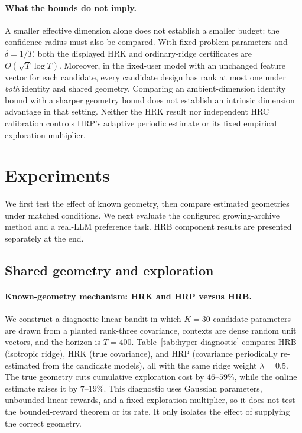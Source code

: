\documentclass{article} %
\begin{document}
\paragraph{What the bounds do not imply.}
A smaller effective dimension alone does not establish a smaller budget:
the confidence radius must also be compared. With fixed problem parameters
and $\delta=1/T$, both the displayed HRK and ordinary-ridge certificates
are $O(\sqrt T\log T)$. Moreover, in the fixed-user model with an unchanged
feature vector for each candidate, every candidate design has rank at most
one under \emph{both} identity and shared geometry. Comparing an
ambient-dimension identity bound with a sharper geometry bound does not
establish an intrinsic dimension advantage in that setting.
Neither the HRK result nor independent HRC calibration controls HRP's
adaptive periodic estimate or its fixed empirical exploration multiplier.

\section{Experiments}
\label{sec:experiments}

We first test the effect of known geometry, then compare estimated
geometries under matched conditions. We next evaluate the configured
growing-archive method and a real-LLM preference task. HRB component results
are presented separately at the end.

\subsection{Shared geometry and exploration}
\label{sec:exp-hyper-ridge-plan}

\paragraph{Known-geometry mechanism: HRK and HRP versus HRB.}
We construct a diagnostic linear bandit in which $K=30$ candidate parameters are drawn from a planted rank-three covariance, contexts are dense random unit vectors, and the horizon is $T=400$. Table~\ref{tab:hyper-diagnostic} compares HRB (isotropic ridge), HRK (true covariance), and HRP (covariance periodically re-estimated from the candidate models), all with the same ridge weight $\lambda=0.5$. The true geometry cuts cumulative exploration cost by $46$--$59\%$, while the online estimate raises it by $7$--$19\%$. This diagnostic uses Gaussian parameters, unbounded linear rewards, and a fixed exploration multiplier, so it does not test the bounded-reward theorem or its rate. It only isolates the effect of supplying the correct geometry.
\end{document}
